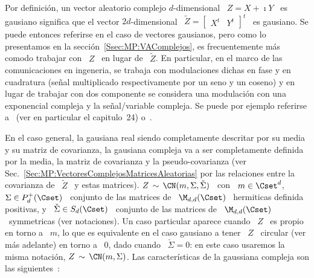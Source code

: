 \label{Sssec:MP:GaussianaComplejas}

Por definici\'on, un vector aleatorio complejo $d$-dimensional \ $Z = X + \imath
Y$ \  es gausiano significa que  el vector $2 d$-dimensional  \ $\widetilde{Z} =
\begin{bmatrix}  X^t &  Y^t \end{bmatrix}^t$  \ es  gausiano. Se  puede entonces
referirse  en el  caso de  vectores gausianos,  pero como  lo presentamos  en la
secci\'on~\ref{Ssec:MP:VAComplejos}, es frecuentemente m\'as comodo trabajar con
\  $Z$ \  en lugar  de \  $\widetilde{Z}$.  En  particular, en  el marco  de las
comunicaciones en  ingeneria, se  trabaja con modulaciones  dichas en fase  y en
cuadratura (se\~nal multiplicado  respectivamente por un seno y  un coseno) y en
lugar  de trabajar  con dos  componente se  considera una  modulaci\'on  con una
exponencial  compleja y  la  se\~nal/variable compleja.   Se  puede por  ejemplo
referirse  a~\cite{Lap17} (ver en  particular el  capitulo~24) o~\cite{SchSch03,
  EriKoi06}.

En el caso general, la gausiana real siendo completamente descritar por su media
y su matriz de covarianza, la  gausiana compleja va a ser completamente definida
por   la  media,   la  matriz   de  covarianza   y  la   pseudo-covarianza  (ver
Sec.~\ref{Sec:MP:VectoresComplejosMatricesAleatorias}  por las  relaciones entre
la  covarianza  de  \ $\widetilde{Z}$  \  y  estas  matrices).   $Z \,  \sim  \,
\CN(m,\Sigma,\check{\Sigma})$  \   con  \  $m  \in  \Cset^d$,   \  $\Sigma  \in
P_d^+(\Cset)$ \  conjunto de  las matrices de  \ $\M_{d,d}(\Cset)$  \ hermiticas
definida  positivas, y  \  $\check{\Sigma}  \in S_d(\Cset)$  \  conjunto de  las
matrices  de  \  $\M_{d,d}(\Cset)$  \  symmetricas (ver  notaciones).   Un  caso
particular  aparece cuando  \ $Z$  \ es  propio en  torno a  \ $m$,  lo  que es
equivalente en el caso gausiano a tener \ $Z$ \ circular (ver m\'as adelante) en
torno a  \ $0$, dado cuando  \ $\check{\Sigma} =  0$: en este caso  usaremos la
misma notaci\'on,  $Z \, \sim  \, \CN(m,\Sigma)$.  Las caracter\'isticas  de la
gaussiana  compleja   son  las  siguientes~\cite{Lap17,   Pic96,  Goo63,  Bos95,
  SchSch03, EriKoi06}:

